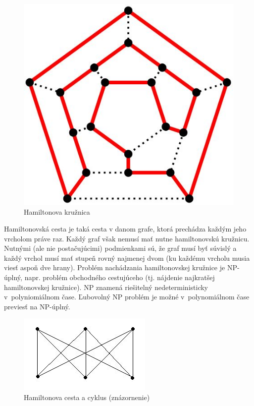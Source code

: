 \documentclass[a4paper,11pt, titlepage]{article}
\begin{document}
\begin{figure}[h]
\centering
\includegraphics[scale=0.25]{path.JPG}
\caption{Hamiltonova kružnica}
\label{Obr. 1}
\end{figure}

\par
Hamiltonovská cesta \cite{EU} je taká cesta v danom grafe, ktorá prechádza každým jeho vrcholom práve raz. Každý graf však nemusí mať nutne hamiltonovskú kružnicu. Nutnými (ale nie postačujúcimi) podmienkami sú, že graf musí byť súvislý a každý vrchol musí mať stupeň rovný najmenej dvom (ku každému vrcholu musia viesť aspoň dve hrany). Problém nachádzania hamiltonovskej kružnice je NP-úplný, napr. problém obchodného cestujúceho (tj. nájdenie najkratšej hamiltonovskej kružnice). NP znamená riešitelný nedeterministicky v~polyniomiálnom čase. Ľubovolný NP problém je možné v~polynomiálnom čase previesť na NP-úplný.

\begin{figure}[h]
\centering
\includegraphics[scale=0.75]{hamiltcycle.JPG}
\caption{Hamiltonova cesta a cyklus (znázornenie)}
\label{Obr. 2}
\end{figure}
\end{document}
